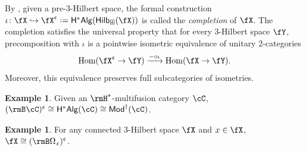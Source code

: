 \documentclass[12pt, reqno]{amsart}
\DeclareMathOperator{\Hom}{Hom}
\renewcommand{\cent}{\textup{\textcent}}
\newcommand{\Mod}{\mathsf{Mod}}
\newcommand{\Hilb}{\mathsf{Hilb}}
\newcommand{\HstarAlg}{\mathsf{H^*Alg}}
\theoremstyle{plain}
\theoremstyle{definition}
\newtheorem{ex}[thm]{Example}
\newcommand{\coloneq}{:=}
\def\coloneq{\mathrel{\vcenter{\baselineskip0.55ex\lineskiplimit0pt\hbox{\upshape.}\hbox{\upshape.}}}=}
\begin{document}
By \cite[Prop.~4.28 and 4.43]{MR5078555}, 
given a pre-3-Hilbert space,
the formal construction 
$\iota\colon \fX\hookrightarrow \fX^\cent\coloneq\HstarAlg(\Hilb_\boxplus(\fX))$ 
is called the \emph{completion} of $\fX$.
The completion
satisfies the universal property that 
for every 3-Hilbert space $\fY$, precomposition with $\iota$ is a pointwise isometric equivalence of unitary 2-categories
\begin{equation}
\label{eq:UniversalPropertyOfCompletion}
\Hom(\fX^\cent\to \fY)
\xrightarrow{-\circ \iota}
\Hom(\fX\to \fY).
\end{equation}
Moreover, this equivalence preserves full subcategories of isometries.

\begin{ex}
\label{ex:CompleteH*mFC}
Given an $\rmH^*$-multifusion category $\cC$, $(\rmB \cC)^\cent\cong \HstarAlg(\cC) \cong \Mod^\dag(\cC)$.
\end{ex}

\begin{ex}
\label{ex:CompleteBLoops}
For any connected 3-Hilbert space $\fX$ and $x\in\fX$, $\fX\cong (\rmB\Omega_x)^\cent$.
\end{ex}
\end{document}

